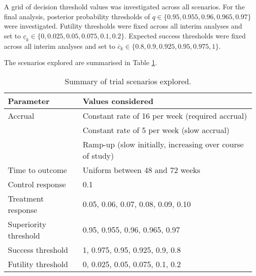 \documentclass{bmcart}
\begin{document}
A grid of decision threshold values was investigated across all scenarios.
For the final analysis, posterior probability thresholds of $q\in\{0.95,0.955,0.96,0.965,0.97\}$ were investigated.
Futility thresholds were fixed across all interim analyses and set to $\underline{c}_k\in\{0,0.025,0.05,0.075,0.1,0.2\}$.
Expected success thresholds were fixed across all interim analyses and set to $\overline{c}_k\in\{0.8,0.9,0.925,0.95,0.975,1\}$.

The scenarios explored are summarised in Table \ref{tab:scenarios}.

\begin{table}[h!]
	\caption{Summary of trial scenarios explored.}
	\label{tab:scenarios}
	\begin{tabular}{ll}
		Parameter & Values considered \\ \hline
		Accrual & Constant rate of 16 per week (required accrual) \\
		& Constant rate of 5 per week (slow accrual) \\
		& Ramp-up (slow initially, increasing over course of study) \\
		Time to outcome & Uniform between 48 and 72 weeks \\
		Control response & 0.1 \\
		Treatment response & 0.05, 0.06, 0.07, 0.08, 0.09, 0.10 \\
		Superiority threshold & 0.95, 0.955, 0.96, 0.965, 0.97 \\
		Success threshold & 1, 0.975, 0.95, 0.925, 0.9, 0.8 \\
		Futility threshold & 0, 0.025, 0.05, 0.075, 0.1, 0.2 \\
		\hline
	\end{tabular}
\end{table}


\end{document}
